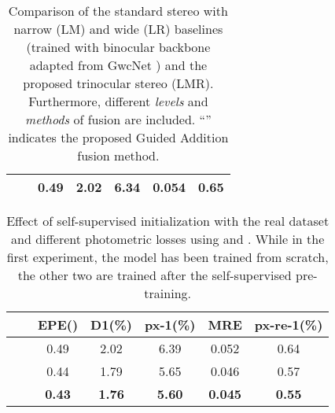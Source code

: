 \documentclass[10pt,twocolumn,letterpaper]{article}
\begin{document}
\begin{table}[tbp]
\begin{center}
\begin{tabular}{@{\hskip1pt}l@{\hskip1pt}|@{\hskip1pt}l@{\hskip1pt}|@{\hskip1pt}c@{\hskip1pt}|@{\hskip1pt}c@{\hskip1pt}|@{\hskip1pt}c@{\hskip1pt}|@{\hskip1pt}c@{\hskip1pt}|@{\hskip1pt}c@{\hskip1pt}}
			&\hspace{0.1cm}      &  \textbf{0.49}        &   \textbf{2.02}      &  \textbf{6.34}    &  0.054   &   0.65      \\  \hline
		\end{tabular}
	\end{center}
	\vspace{-0.3cm}
	\caption{Comparison of the standard stereo with narrow (LM) and wide (LR) baselines (trained with binocular backbone adapted from GwcNet \cite{guo2019group}) and the proposed trinocular stereo (LMR). Furthermore, different \emph{levels} and \emph{methods} of fusion are included. \enquote{} indicates the proposed Guided Addition fusion method.}
	\label{tab:comb}
\end{table}
 \begin{table}[tbp]
	\begin{center}
		\footnotesize
		\begin{tabular}{@{\hskip1pt}c@{\hskip4pt}c@{\hskip1pt}|@{\hskip1pt}c@{\hskip1pt}|@{\hskip1pt}c@{\hskip1pt}|@{\hskip1pt}c@{\hskip1pt}|@{\hskip1pt}c@{\hskip1pt}|@{\hskip1pt}c@{\hskip1pt}}
			\hline				
			         &         & \hspace{0.1cm}EPE() & \hspace{0.1cm}D1(\%) &\hspace{0.1cm}px-1(\%) &  \hspace{0.1cm}MRE & \hspace{0.1cm}px-re-1(\%) \\ \hline
			&                 &  0.49  &  2.02  &    6.39   &    0.052   &   0.64         \\ \hdashline
			\checkmark    &                 &  0.44  &  1.79  &    5.65   &    0.046   &   0.57       \\
			&   \checkmark    &  \textbf{0.43}  &  \textbf{1.76}  &    \textbf{5.60}   &    \textbf{0.045}   &   \textbf{0.55}    \\ \hline
		\end{tabular}
	\end{center}
	\vspace{-0.3cm}
	\caption{Effect of self-supervised initialization with the real dataset and different photometric losses using  and . While in the first experiment, the model has been trained from scratch, the other two are trained after the self-supervised pre-training.}
	\label{tab:initWarp}
\end{table} \begin{table}[tbp]
	\begin{center}

\end{center}
\end{table}
\end{document}
